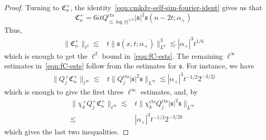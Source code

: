 \documentclass[letterpaper, reqno,final]{amsart}
\newcommand{\fs}{\mathfrak{s}}
\newcommand{\fC}{\mathfrak{C}}
\newcommand{\fL}{\mathfrak{L}}
\newcommand{\bigO}[1]{O\left({#1}\right)}
\newcommand{\tcts}{\text{cts}}
\newtheorem{rmk}{Remark}
\begin{document}
\begin{proof}
    Turning to $\fC_n^+$, the identity~\eqref{eqn:cmkdv-self-sim-fourier-ident} gives us that
    \begin{equation*}
        \fC_n^+ = 6it Q_{\lesssim \log |t|^{1/5}}^\tcts |\fs|^2\fs(n - 2t;\alpha_+)
    \end{equation*}
    Thus,
    \begin{equation*}\begin{split}
        \lVert \fC_n^+ \rVert_{\ell^2} \lesssim& t \lVert \fs(x,t;\alpha_+) \rVert_{L^6}^3
        \lesssim |\alpha_+|^3 t^{1/6}
    \end{split}
    \end{equation*}
    which is enough to get the $\ell^2$ bound in~\eqref{eqn:fC-ests}.  The remaining $\ell^\infty$ estimates in~\eqref{eqn:fC-ests} follow from the estimates for $\fs$. For instance, we have
    \begin{equation*}\begin{split}
        \lVert Q_j^+ \fC^+_n \rVert_{\ell^\infty} \lesssim& t\lVert Q_j^\tcts |\fs|^2\fs \rVert_{L^\infty}
        \lesssim |\alpha_{+}|^3 t^{-1/2} 2^{-3/2j}
    \end{split}\end{equation*}
    which is enough to give the first three $\ell^\infty$ estimates, and, by~
    \begin{equation*}\begin{split}
        \lVert \chi_{k}^+ Q_j^+ \fC^+_n \rVert_{\ell^\infty} \lesssim& t\lVert \chi_k^\tcts Q_j^\tcts |\fs|^2\fs \rVert_{L^\infty}\\
        \lesssim& |\alpha_{+}|^3 t^{-1/2} 2^{-3/2k}
    \end{split}\end{equation*}
    which gives the last two inequalities.
\end{proof}

\end{document}
